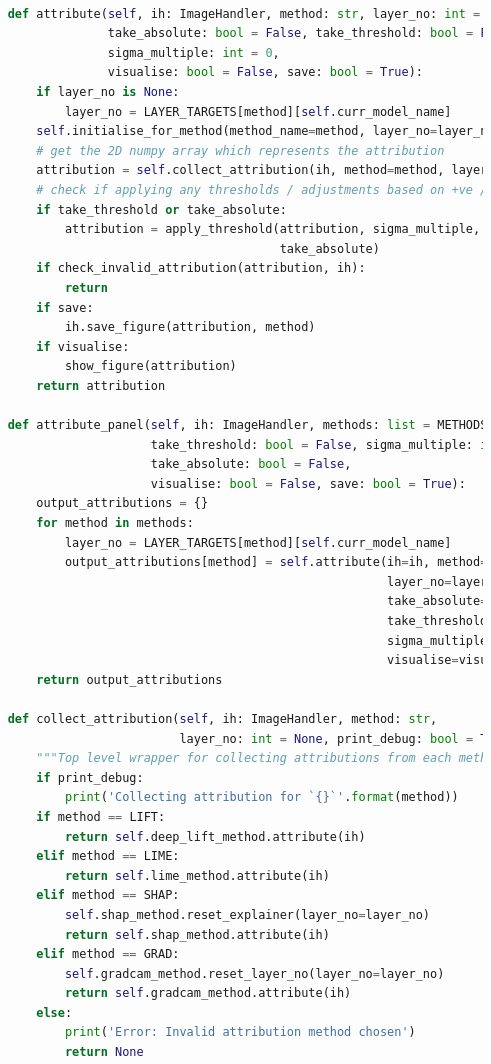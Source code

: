 \documentclass[main]{subfiles}
\begin{document}
	\begin{lstlisting}[language=Python,basicstyle=\scriptsize]
        
    def attribute(self, ih: ImageHandler, method: str, layer_no: int = None,
                  take_absolute: bool = False, take_threshold: bool = False, 
                  sigma_multiple: int = 0,
                  visualise: bool = False, save: bool = True):
        if layer_no is None:
            layer_no = LAYER_TARGETS[method][self.curr_model_name]
        self.initialise_for_method(method_name=method, layer_no=layer_no)
        # get the 2D numpy array which represents the attribution
        attribution = self.collect_attribution(ih, method=method, layer_no=layer_no)
        # check if applying any thresholds / adjustments based on +ve / -ve evidence
        if take_threshold or take_absolute:
            attribution = apply_threshold(attribution, sigma_multiple, 
                                          take_absolute)
        if check_invalid_attribution(attribution, ih):
            return
        if save:
            ih.save_figure(attribution, method)
        if visualise:
            show_figure(attribution)
        return attribution

    def attribute_panel(self, ih: ImageHandler, methods: list = METHODS,
                        take_threshold: bool = False, sigma_multiple: int = 0, 
                        take_absolute: bool = False,
                        visualise: bool = False, save: bool = True):
        output_attributions = {}
        for method in methods:
            layer_no = LAYER_TARGETS[method][self.curr_model_name]
            output_attributions[method] = self.attribute(ih=ih, method=method, 
                                                         layer_no=layer_no,
                                                         take_absolute=take_absolute, 
                                                         take_threshold=take_threshold,
                                                         sigma_multiple=sigma_multiple,
                                                         visualise=visualise, save=save)
        return output_attributions

    def collect_attribution(self, ih: ImageHandler, method: str, 
                            layer_no: int = None, print_debug: bool = True):
        """Top level wrapper for collecting attributions from each method. """
        if print_debug:
            print('Collecting attribution for `{}`'.format(method))
        if method == LIFT:
            return self.deep_lift_method.attribute(ih)
        elif method == LIME:
            return self.lime_method.attribute(ih)
        elif method == SHAP:
            self.shap_method.reset_explainer(layer_no=layer_no)
            return self.shap_method.attribute(ih)
        elif method == GRAD:
            self.gradcam_method.reset_layer_no(layer_no=layer_no)
            return self.gradcam_method.attribute(ih)
        else:
            print('Error: Invalid attribution method chosen')
            return None


\end{lstlisting}
\end{document}
